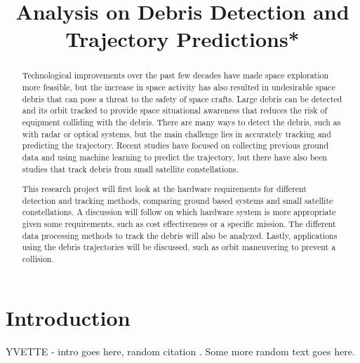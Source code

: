 \documentclass[conference]{IEEEtran}
\begin{document}
	
	\title{Analysis on Debris Detection and Trajectory Predictions*}
	\author{
	}
	\maketitle
	
	\begin{abstract}
		  
		Technological improvements over the past few decades have made space exploration more feasible, but the increase in space activity has also resulted in undesirable space debris that can pose a threat to the safety of space crafts. Large debris can be detected and its orbit tracked to provide space situational awareness that reduces the risk of equipment colliding with the debris. There are many ways to detect the debris, such as with radar or optical systems, but the main challenge lies in accurately tracking and predicting the trajectory. Recent studies have focused on collecting previous ground data and using machine learning to predict the trajectory, but there have also been studies that track debris from small satellite constellations. \
		
		This research project will first look at the hardware requirements for different detection and tracking methods, comparing ground based systems and small satellite constellations. A discussion will follow on which hardware system is more appropriate given some requirements, such as cost effectiveness or a specific mission. The different data processing methods to track the debris will also be analyzed. Lastly, applications using the debris trajectories will be discussed, such as orbit maneuvering to prevent a collision.\cite{2013_orbit_pred}

	\end{abstract}

	\section{Introduction}
	
	YVETTE - intro goes here, random citation \cite{2019_lidar}. Some more random text goes here.


	\nocite{*}
	\printbibliography
	
\end{document}
